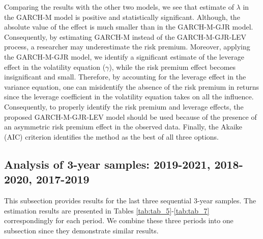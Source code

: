 \documentclass[authoryear, 1p]{elsarticle}
\numberwithin{equation}{section}
\begin{document}
Comparing the results with the other two models, we see that estimate of $\lambda$ in the GARCH-M model is positive and statistically significant. Although, the absolute value of the effect is much smaller than in the GARCH-M-GJR model. Consequently, by estimating GARCH-M instead of the GARCH-M-GJR-LEV process, a researcher may underestimate the risk premium. Moreover, applying the GARCH-M-GJR model, we identify a significant estimate of the leverage effect in the volatility equation ($\gamma$), while the risk premium effect becomes insignificant and small. Therefore, by accounting for the leverage effect in the variance equation, one can misidentify the absence of the risk premium in returns since the leverage coefficient in the volatility equation takes on all the influence. Consequently, to properly identify the risk premium and leverage effects, the proposed GARCH-M-GJR-LEV model should be used because of the presence of an asymmetric risk premium effect in the observed data. Finally, the Akaike (AIC) criterion identifies the method as the best of all three options.

\subsection{Analysis of 3-year samples: 2019-2021, 2018-2020, 2017-2019}

This subsection provides results for the last three sequential 3-year samples. The estimation results are presented in Tables \ref{tab:tab_5}-\ref{tab:tab_7} correspondingly for each period. We combine these three periods into one subsection since they demonstrate similar results.
\end{document}
